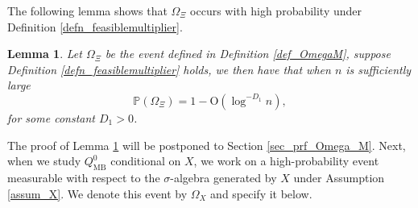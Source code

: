 \documentclass[12pt]{article}
\theoremstyle{plain}
\newtheorem{lemma}{Lemma}[section]
\numberwithin{equation}{section}
\begin{document}
The following lemma shows that $\Omega_\Xi$ occurs with high probability under Definition \ref{defn_feasiblemultiplier}.

\begin{lemma}\label{lem_probabilitycontrol_M}
	Let $\Omega_\Xi$ be the event defined in Definition \ref{def_OmegaM}, suppose Definition \ref{defn_feasiblemultiplier} holds, we then have that when $n$ is sufficiently large  
	\begin{equation*}
		\mathbb{P}(\Omega_\Xi)=1-\mathrm{O}(\log^{-D_1}n),
	\end{equation*}
	for some constant $D_1>0$.
\end{lemma}
The proof of Lemma \ref{lem_probabilitycontrol_M} will be postponed to Section \ref{sec_prf_Omega_M}. Next, when we study $Q_{\mathrm{MB}}^0$ conditional on $X$, we work on a high-probability event measurable with respect to the $\sigma$-algebra generated by $X$ under Assumption \ref{assum_X}. We denote this event by $\Omega_X$ and specify it below.
\end{document}
